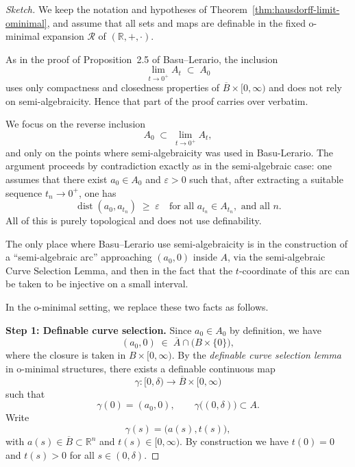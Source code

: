 \begin{proof}[Sketch]
    We keep the notation and hypotheses of Theorem~\ref{thm:hausdorff-limit-ominimal},
    and assume that all sets and maps are definable in the fixed o\mbox{-}minimal
    expansion $\mathcal{R}$ of $(\mathbb{R},+,\cdot)$.
    
    As in the proof of Proposition~2.5 of Basu--Lerario, the inclusion
    \begin{equation*}
    \lim_{t \to 0^+} A_t \;\subset\; A_0
    \end{equation*}
    uses only compactness and closedness properties of $\overline{B} \times [0,\infty)$
    and does not rely on semi-algebraicity. Hence that part of the proof carries
    over verbatim.
    
    We focus on the reverse inclusion
    \begin{equation*}
    A_0 \;\subset\; \lim_{t \to 0^+} A_t,
    \end{equation*}
    and only on the points where semi-algebraicity was used in
    Basu-Lerario. The argument proceeds by contradiction exactly as in the
    semi-algebraic case: one assumes that there exist $a_0 \in A_0$ and
    $\varepsilon > 0$ such that, after extracting a suitable sequence
    $t_n \to 0^+$, one has
    \begin{equation}\label{eq:BL-ineq}
      \operatorname{dist}(a_0, a_{t_n}) \;\geq\; \varepsilon
      \quad\text{for all } a_{t_n} \in A_{t_n}, \text{ and all } n.
    \end{equation}
    All of this is purely topological and does not use definability.
    
    The only place where Basu--Lerario use semi-algebraicity is in the
    construction of a ``semi-algebraic arc'' approaching $(a_0,0)$ inside
    $A$, via the semi-algebraic Curve Selection Lemma, and then in the
    fact that the $t$-coordinate of this arc can be taken to be injective
    on a small interval.
    
    In the o\mbox{-}minimal setting, we replace these two facts as follows.
    
    \noindent\textbf{Step 1: Definable curve selection.}
    Since $a_0 \in A_0$ by definition, we have
    \[
    (a_0,0) \;\in\; \overline{A} \cap \bigl( B \times \{0\} \bigr),
    \]
    where the closure is taken in $B \times [0,\infty)$.
    By the \emph{definable curve selection lemma} in o\mbox{-}minimal structures,
    there exists a definable continuous map
    \[
    \gamma \colon [0,\delta) \to \overline{B} \times [0,\infty)
    \]
    such that
    \[
    \gamma(0) = (a_0,0), \qquad
    \gamma\bigl( (0,\delta) \bigr) \subset A.
    \]
    Write
    \[
    \gamma(s) = \bigl( a(s), t(s) \bigr),
    \]
    with $a(s) \in \overline{B} \subset \mathbb{R}^n$ and $t(s) \in [0,\infty)$.
    By construction we have $t(0) = 0$ and $t(s) > 0$ for all $s \in (0,\delta)$.
    

\end{proof}
